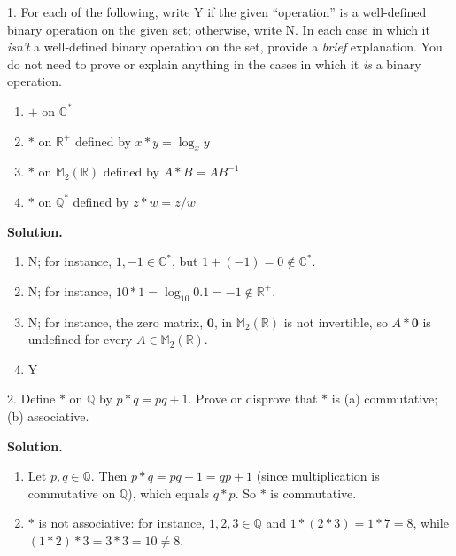 \documentclass[10pt,]{book}
\theoremstyle{plain}
\theoremstyle{definition}
\theoremstyle{definition}
\theoremstyle{definition}
\theoremstyle{definition}
\numberwithin{equation}{section}
\def\R{\mathbb{R}}
\def\Q{\mathbb{Q}}
\def\C{\mathbb{C}}
\def\M{\mathbb{M}}
\def\0{\mathbf 0}
\begin{document}
\begin{exerciselist}
\item[1.]\hypertarget{exercise-7}{}For each of the following, write Y if the given ``operation'' is a well-defined binary operation on the given set; otherwise, write N. In each case in which it \emph{isn't} a well-defined binary operation on the set, provide a \emph{brief} explanation. You do not need to prove or explain anything in the cases in which it \emph{is} a binary operation. \leavevmode%
\begin{enumerate}[label=(\alph*)]
\item\hypertarget{li-58}{}\(+\) on \(\C^*\)%
\item\hypertarget{li-59}{}\(*\) on \(\R^+\) defined by \(x*y=\log_x y\)%
\item\hypertarget{li-60}{}\(*\) on \(\M_2(\R)\) defined by \(A*B=AB^{-1}\)%
\item\hypertarget{li-61}{}\(*\) on \(\Q^*\) defined by \(z*w=z/w\)%
\end{enumerate}
%
\par\smallskip
\par\smallskip
\noindent\textbf{Solution.}\hypertarget{solution-7}{}\quad
\leavevmode%
\begin{enumerate}[label=(\alph*)]
\item\hypertarget{li-62}{}N; for instance, \(1,-1\in \C^*\), but \(1+(-1)=0\not \in \C^*\).%
\item\hypertarget{li-63}{}N; for instance, \(10*1=\log_{10}0.1=-1\not\in\R^+\).%
\item\hypertarget{li-64}{}N; for instance, the zero matrix, \(\0\), in \(\M_2(\R)\) is not invertible, so \(A*\0\) is undefined for every \(A\in\M_2(\R)\).%
\item\hypertarget{li-65}{}Y%
\end{enumerate}
%
\item[2.]\hypertarget{exercise-8}{}Define \(*\) on \(\Q\) by \(p*q=pq+1\). Prove or disprove that \(*\) is (a) commutative; (b) associative.%
\par\smallskip
\par\smallskip
\noindent\textbf{Solution.}\hypertarget{solution-8}{}\quad
\leavevmode%
\begin{enumerate}[label=(\alph*)]
\item\hypertarget{li-66}{}Let \(p,q\in \Q\).  Then \(p*q=pq+1=qp+1\) (since multiplication is commutative on \(\Q\)), which equals \(q*p\).  So \(*\) is commutative.%
\item\hypertarget{li-67}{}\(*\) is not associative: for instance, \(1,2,3\in \Q\) and \(1*(2*3)=1*7=8\), while \((1*2)*3=3*3=10\neq 8\).%

\end{enumerate}
\end{exerciselist}
\end{document}
